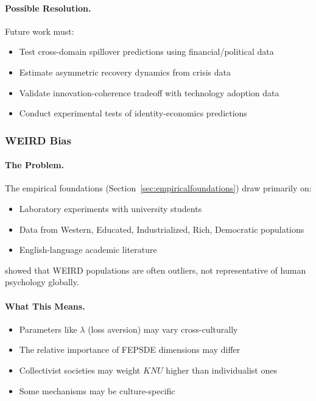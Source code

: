 \paragraph{Possible Resolution.}
Future work must:
\begin{itemize}
  \item Test cross-domain spillover predictions using financial/political data
  \item Estimate asymmetric recovery dynamics from crisis data
  \item Validate innovation-coherence tradeoff with technology adoption data
  \item Conduct experimental tests of identity-economics predictions
\end{itemize}

\subsubsection{WEIRD Bias}

\paragraph{The Problem.}
The empirical foundations (Section~\ref{sec:empiricalfoundations}) draw primarily on:
\begin{itemize}
  \item Laboratory experiments with university students
  \item Data from Western, Educated, Industrialized, Rich, Democratic populations
  \item English-language academic literature
\end{itemize}

\citet{henrich2010} showed that WEIRD populations are often outliers,
not representative of human psychology globally.

\paragraph{What This Means.}
\begin{itemize}
  \item Parameters like $\lambda$ (loss aversion) may vary cross-culturally
  \item The relative importance of FEPSDE dimensions may differ
  \item Collectivist societies may weight $KNU$ higher than individualist ones
  \item Some mechanisms may be culture-specific
\end{itemize}

